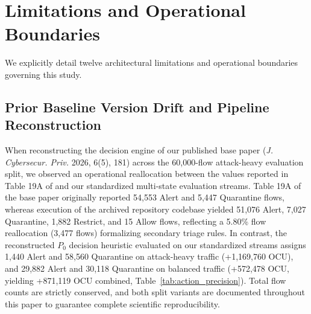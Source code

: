 \documentclass[journal,10pt,onecolumn]{IEEEtran}
\begin{document}
\section{Limitations and Operational Boundaries}\label{sec:limitations}

We explicitly detail twelve architectural limitations and operational boundaries governing this study.

\subsection{Prior Baseline Version Drift and Pipeline Reconstruction}
When reconstructing the decision engine of our published base paper \cite{1} (\textit{J. Cybersecur. Priv.} 2026, 6(5), 181) across the 60,000-flow attack-heavy evaluation split, we observed an operational reallocation between the values reported in Table 19A of \cite{1} and our standardized multi-state evaluation streams. Table 19A of the base paper \cite{1} originally reported 54,553 Alert and 5,447 Quarantine flows, whereas execution of the archived repository codebase yielded 51,076 Alert, 7,027 Quarantine, 1,882 Restrict, and 15 Allow flows, reflecting a 5.80\% flow reallocation (3,477 flows) formalizing secondary triage rules. In contrast, the reconstructed $P_0$ decision heuristic evaluated on our standardized streams assigns 1,440 Alert and 58,560 Quarantine on attack-heavy traffic (+1,169,760 OCU), and 29,882 Alert and 30,118 Quarantine on balanced traffic (+572,478 OCU, yielding +871,119 OCU combined, Table~\ref{tab:action_precision}). Total flow counts are strictly conserved, and both split variants are documented throughout this paper to guarantee complete scientific reproducibility.
\end{document}
